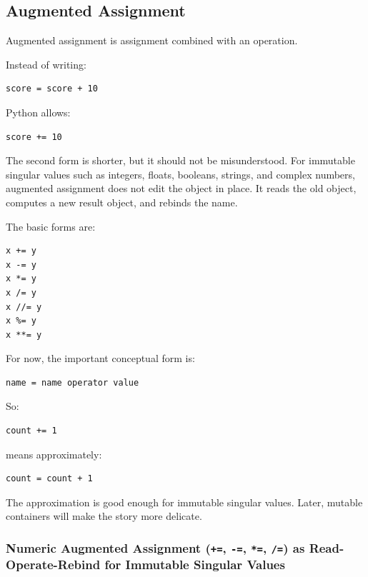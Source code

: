 \subsection{Augmented Assignment}

Augmented assignment is assignment combined with an operation.

Instead of writing:

\begin{verbatim}
score = score + 10
\end{verbatim}

Python allows:

\begin{verbatim}
score += 10
\end{verbatim}

The second form is shorter, but it should not be misunderstood. For immutable singular values such as integers, floats, booleans, strings, and complex numbers, augmented assignment does not edit the object in place. It reads the old object, computes a new result object, and rebinds the name.

The basic forms are:

\begin{verbatim}
x += y
x -= y
x *= y
x /= y
x //= y
x %= y
x **= y
\end{verbatim}

For now, the important conceptual form is:

\begin{verbatim}
name = name operator value
\end{verbatim}

So:

\begin{verbatim}
count += 1
\end{verbatim}

means approximately:

\begin{verbatim}
count = count + 1
\end{verbatim}

The approximation is good enough for immutable singular values. Later, mutable containers will make the story more delicate.

\subsubsection{Numeric Augmented Assignment (\texttt{+=}, \texttt{-=}, \texttt{*=}, \texttt{/=}) as Read-Operate-Rebind for Immutable Singular Values}

